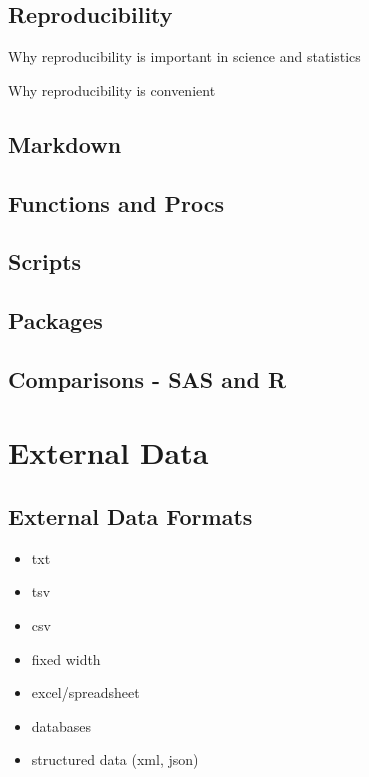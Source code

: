 \documentclass[]{book}
\providecommand{\tightlist}{%
  \setlength{\itemsep}{0pt}\setlength{\parskip}{0pt}}
\begin{document}
\hypertarget{reproducibility}{%
\section{Reproducibility}\label{reproducibility}}

Why reproducibility is important in science and statistics

Why reproducibility is convenient

\hypertarget{markdown}{%
\section{Markdown}\label{markdown}}

\hypertarget{functions-and-procs}{%
\section{Functions and Procs}\label{functions-and-procs}}

\hypertarget{scripts}{%
\section{Scripts}\label{scripts}}

\hypertarget{packages}{%
\section{Packages}\label{packages}}

\hypertarget{comparisons---sas-and-r}{%
\section{Comparisons - SAS and R}\label{comparisons---sas-and-r}}

\hypertarget{reading-data}{%
\chapter{External Data}\label{reading-data}}

\hypertarget{external-data-formats}{%
\section{External Data Formats}\label{external-data-formats}}

\begin{itemize}
\tightlist
\item
  txt
\item
  tsv
\item
  csv
\item
  fixed width
\item
  excel/spreadsheet
\item
  databases
\item
  structured data (xml, json)
\end{itemize}
\end{document}
